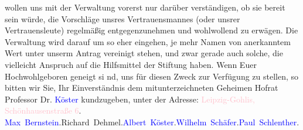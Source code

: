                     wollen uns mit der Verwaltung vorerst nur darüber verständigen, ob sie  bereit sein würde, die Vorschläge
                    unsres Vertrauensmannes (oder unsrer Vertrauensleute) regelmäßig
                    entgegenzunehmen und wohlwollend zu erwägen. Die Verwaltung wird darauf um so
                    eher eingehen, je mehr Namen von anerkanntem Wert unter unserm Antrag vereinigt
                    stehen, und zwar gerade auch solche, die vielleicht Anspruch auf die Hilfsmittel
                    der Stiftung haben.\pend
           \pstart
           Wenn Euer Hochwohlgeboren geneigt si nd, uns für diesen Zweck  zur Verfügung zu stellen, so bitten
                    wir Sie, Ihr Einverständnis  dem mitunterzeichneten Geheimen Hofrat Professor Dr. \textcolor{blue}{Köster}{}\ledrightnote{\textcolor{blue}{Albert Köster}} kundzugeben, unter der Adresse: \textcolor{pink}{Leipzig-Gohlis, Schönhausenstraße 6}{}\ledrightnote{\textcolor{pink}{Fritz-Seger-Straße}}. \pend
           \pstart \spacefill\mbox{\textcolor{blue}{Max Bernstein}{}\ledrightnote{\textcolor{blue}{Max Bernstein}}.}\spacefill\mbox{Richard Dehmel.}\spacefill\mbox{\textcolor{blue}{Albert Köster}{}\ledrightnote{\textcolor{blue}{Albert Köster}}.}\spacefill\mbox{\textcolor{blue}{Wilhelm Schäfer}{}\ledrightnote{\textcolor{blue}{Wilhelm Schäfer}}.}\spacefill\mbox{\textcolor{blue}{Paul
                        Schlenther}{}\ledrightnote{\textcolor{blue}{Paul Schlenther}}.}\pend{}\endnumbering{}  
      
